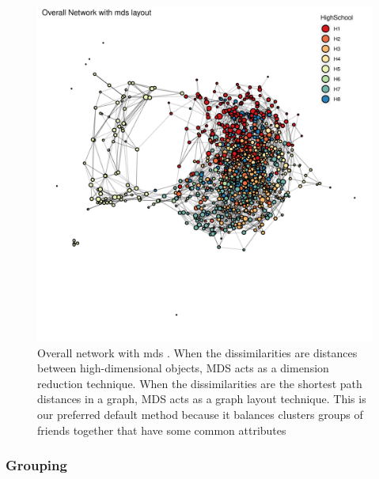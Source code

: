     \begin{figure}[h]
        \centering
            \includegraphics[width=0.7\linewidth]{figures/Networks/Layouts/Graph_OverallNetwork_with_no_highlight_mds_HighSchool___mds.png} 
        \caption{Overall network with \gls{mds} \cite{Buja2008}. When the dissimilarities are distances between high-dimensional objects, MDS acts as a dimension reduction technique. When the dissimilarities are the shortest path distances in a graph, MDS acts as a graph layout technique. This is our preferred default method because it balances clusters groups of friends together that have some common attributes}
        \label{figure:networksLayoutsMDS}
    \end{figure}    

\clearpage


\subsubsection{Grouping}

